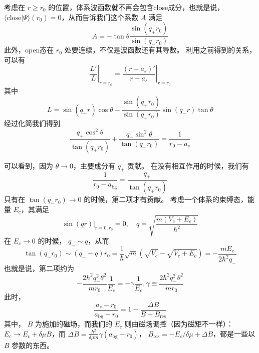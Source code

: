 考虑在 $r\geqslant r_0$ 的位置，体系波函数就不再会包含close成分，也就是说， $\langle\text{close}|\Psi\rangle(r_0) = 0$，从而告诉我们这个系数 $A$ 满足
\begin{equation}
A=-\tan\theta\frac{\sin(q_+r_0)}{\sin(q_-r_0)}
\end{equation}
此外，open态在 $r_0$ 处要连续，不仅是波函数还有其导数。 利用之前得到的关系，可以有
\begin{equation}
\left.\frac{L'}{L}\right|_{r=r_0} = \left.\frac{(r-a_s)'}{r-a_s}\right|_{r=r_0}
\end{equation}
其中
\begin{equation}
L = \sin(q_+r)\cos\theta - \frac{\sin(q_+r_0)}{\sin(q_-r_0)} \sin(q_-r)\tan\theta
\end{equation}
经过化简我们得到
\begin{equation}
\frac{q_+\cos^2\theta}{\tan(q_+r_0)}+\frac{q_-\sin^2\theta}{\tan(q_-r_0)} = \frac{1}{r_0-a_s}
\end{equation}

可以看到，因为 $\theta\to0$，主要成分有 $q_+$ 贡献。 在没有相互作用的时候，我们有
\begin{equation}
\frac{1}{r_0-a_{\text{bg}}} = \frac{q_+}{\tan(q_+r_0)}
\end{equation}
只有在 $\tan(q_-r_0)\to0$ 的时候，第二项才有贡献。
考虑一个体系的束缚态，能量 $E_c$，其满足
\begin{equation}
\left.\sin(qr)\right|_{r=0,r_0} = 0,\quad q = \sqrt{\frac{m(V_c+E_c)}{\hbar^2}}
\end{equation}
在 $E_c\to0$ 的时候， $q_-\sim q$，从而
\begin{equation}
\tan(q_-r_0)\sim (q_- -q) r_0 = \frac{1}{\hbar}\sqrt{m}(\sqrt{V_c}-\sqrt{V_c+E_c}) =-\frac{mE_c}{2\hbar^2 q_-}
\end{equation}
也就是说，第二项约为
\begin{equation}
-\frac{2\hbar^2q_-^2\theta^2}{mr_0}\frac{1}{E_c} = -\gamma\frac{1}{E_c}, \gamma\equiv\frac{2\hbar^2q_-^2\theta^2}{mr_0} 
\end{equation}
此时，
\begin{equation}
\frac{a_s-r_0}{a_{\text{bg}}-r_0} = 1-\frac{\Delta B}{B-B_{\text{res}}}
\end{equation}
其中， $B$ 为施加的磁场，而我们的 $E_c$ 则由磁场调控（因为磁矩不一样）： $E_c\to E_c+\delta\mu B$，而 $\Delta B = \frac{\hbar^2}{\delta\mu m}\gamma(a_{\text{bg}}-r_0)$， $B_{\text{res}} = -{E_c}/{\delta\mu}+\Delta B$，都是一些以 $B$ 参数的东西。